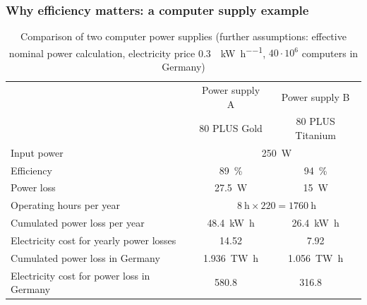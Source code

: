 \begin{frame}[c]
	\frametitle{Why efficiency matters: a computer supply example}
	\begin{table}
		\centering
		\begin{tabular}{lcc}
			\toprule
			& Power supply A & Power supply B \\
			& 80 PLUS Gold & 80 PLUS Titanium \\
			\midrule
			Input power & \multicolumn{2}{c}{\SI{250}{\watt}} \pause\\
			Efficiency & \SI{89}{\percent} & \SI{94}{\percent}  \pause\\
			Power loss & \SI{27.5}{\watt} & \SI{15}{\watt} \pause\\
			\midrule
			Operating hours per year & \multicolumn{2}{c}{$\SI{8}{\hour} \times 220 = \SI{1760}{\hour}$} \pause\\
			Cumulated power loss per year & \SI{48.4}{\kilo\watt\hour} & \SI{26.4}{\kilo\watt\hour} \pause\\
			Electricity cost for yearly power losses & \SI{14.52}{\EUR} & \SI{7.92}{\EUR} \pause\\
			\midrule
			Cumulated power loss in Germany & \SI{1.936}{\tera\watt\hour} & \SI{1.056}{\tera\watt\hour} \pause\\
			Electricity cost for power loss in Germany & \SI{580.8}{\mega\EUR} & \SI{316.8}{\mega\EUR} \\
			\bottomrule
		\end{tabular}
		\label{tab:efficiency_computer_supply_example}
		\caption{Comparison of two computer power supplies (further assumptions: effective nominal power calculation, electricity price \SI[fraction-function=\nicefrac]{0.3}{\EUR\per\kilo\watt\per\hour}, $40\cdot 10^6$ computers in Germany)}
	\end{table}
\end{frame}

